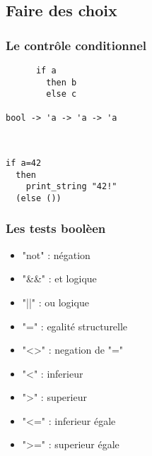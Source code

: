 \subsection{Faire des choix} %
\begin{frame}[fragile]
	\frametitle{Le contrôle conditionnel}
	\begin{center}
		\begin{minipage}{6cm}
			\lstset{basicstyle=\Large}
			\begin{lstlisting}
      if a
        then b 
        else c

bool -> 'a -> 'a -> 'a
			\end{lstlisting}
		\end{minipage}\\
		\begin{minipage}{4cm}
			\lstset{basicstyle=\scriptsize}
			\begin{lstlisting}
if a=42
  then 
    print_string "42!" 
  (else ())
			\end{lstlisting}
		\end{minipage}
	\end{center}
\end{frame}

\begin{frame}
    \frametitle{Les tests boolèen}
	\begin{center}
		\begin{center}
			\begin{minipage}{4cm}
				\begin{itemize}
					\item "not" : négation
					\item "\&\&" : et logique
					\item "||" : ou logique
				\end{itemize}
			\end{minipage}
			\begin{minipage}{5cm}
				\begin{itemize}
					\item "=" : egalité structurelle
					\item "<>" : negation de "="
				\end{itemize}
			\end{minipage}
		\end{center}\vspace{0.2cm}
		\begin{minipage}{4.5cm}
			\begin{itemize}
				\item "<" : inferieur 
				\item ">" : superieur
				\item "<=" : inferieur égale
				\item ">=" : superieur égale
			\end{itemize}
		\end{minipage}
	\end{center}
\end{frame}

